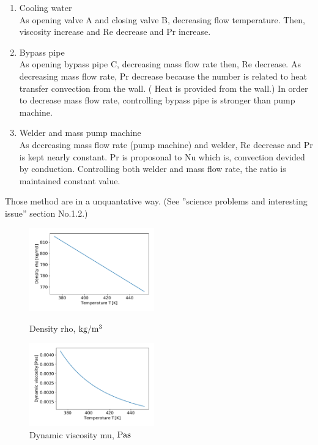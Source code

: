 \documentclass[conference]{IEEEtran}
\begin{document}
\begin{enumerate}
  \item Cooling water\\
  As opening valve A and closing valve B, decreasing flow temperature.
  Then, viscosity increase and Re decrease and Pr increase.
  \item Bypass pipe\\
  As opening bypass pipe C, decreasing mass flow rate then, Re decrease.
  As decreasing mass flow rate, Pr decrease because the number is related to heat transfer convection from the wall. ( Heat is provided from the wall.)
  In order to decrease mass flow rate, controlling bypass pipe is stronger than pump machine.
  \item Welder and mass pump machine\\
  As decreasing mass flow rate (pump machine) and welder, Re decrease and Pr is kept nearly constant.
  Pr is proposonal to Nu which is, convection devided by conduction.
  Controlling both welder and mass flow rate, the ratio is maintained constant value.
\end{enumerate}
Those method are in a unquantative way.
(See ''science problems and interesting issue'' section No.1.2.)

\begin{figure}[h]
\vspace{3zh}
\begin{minipage}{0.48\linewidth}
 \includegraphics[width=0.48\textwidth,natwidth=200,natheight=220]{fig/density_rho.pdf}
 \vspace{-1.5zh}
 \caption{Density rho, $\rm kg/m^{3}$}\label{density_rho}
\end{minipage}
\hfill
\begin{minipage}{0.48\linewidth}
 \includegraphics[width=0.48\textwidth,natwidth=190,natheight=210]{fig/dynamic_viscosity.pdf}
 \vspace{-1.5zh}
 \caption{Dynamic viscosity mu, $\rm Pa s$}\label{dynamic_viscosity}
\end{minipage}
\vspace{2zh}
\end{figure}
\end{document}
